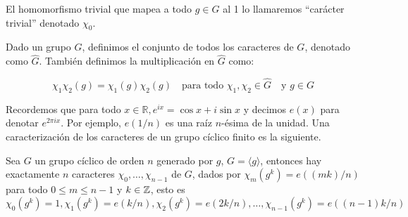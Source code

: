  El homomorfismo trivial que mapea a todo $g\in G$ al 1 lo llamaremos ``carácter trivial'' denotado $\chi_0$.\\

 \begin{definition}
 Dado un grupo $G$, definimos el conjunto de todos los caracteres de $G$, denotado como $\widehat{G}$. También definimos la multiplicación en $\widehat{G}$ como:

$$\chi_1\chi_2(g)=\chi_1(g)\chi_2(g) \quad \text{para todo } \chi_1,\chi_2\in \widehat{G} \quad \text{y } g\in G$$

 \end{definition}

 Recordemos que para todo $x \in \mathbb{R}, e^{ix}=\cos x+i \sin x$ y decimos $e(x)$ para denotar $e^{2 \pi i x}$. Por ejemplo, $e(1 / n)$ es una raíz $n$-ésima de la unidad. Una caracterización de los caracteres de un grupo cíclico finito es la siguiente.

\begin{theorem}
Sea $G$ un grupo cíclico de orden $n$ generado por $g$, $G=\langle g\rangle$, entonces hay exactamente $n$ caracteres $\chi_0,\ldots,\chi_{n-1}$ de $G$, dados por $\chi_m(g^k)=e\left((mk)/n\right)$ para todo $0\leq m\leq n-1$ y $k\in \mathbb{Z}$, esto es 
$$\chi_0(g^k)=1, \chi_1(g^k)=e(k/n),\chi_2(g^k)=e(2k/n),\ldots,\chi_{n-1}(g^k)=e((n-1)k/n)$$
\end{theorem}

